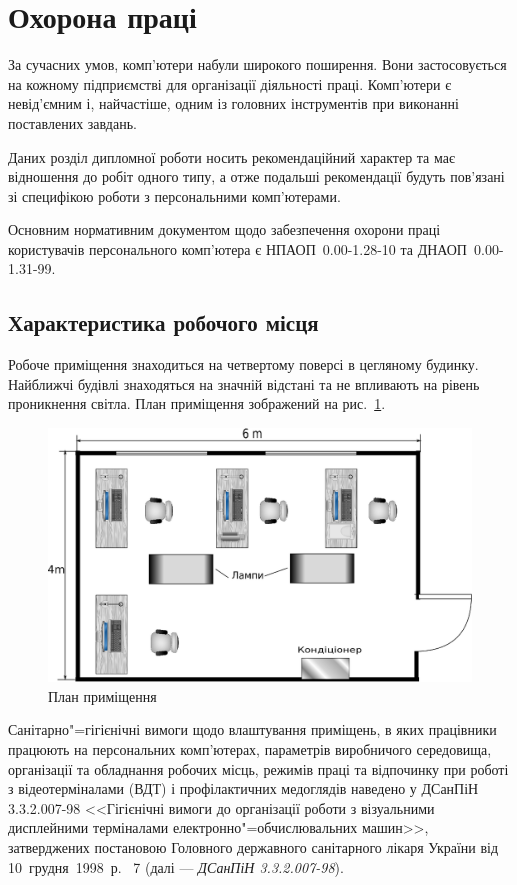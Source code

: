 \documentclass[simple,14pt,utf8,ukrainian]{eskdtext}
\begin{document}
\tableofcontents
\clearpage
\section{Охорона праці}\label{sec:WS}
  За сучасних умов, комп’ютери набули широкого поширення.
  Вони застосовується на кожному підприємстві для організації діяльності
  праці.
  Комп’ютери є невід’ємним і, найчастіше, одним із головних інструментів при
  виконанні поставлених завдань.

  Даних розділ дипломної роботи носить рекомендаційний характер та має
  відношення до робіт одного типу, а отже подальші рекомендації будуть
  пов’язані зі специфікою роботи з персональними комп’ютерами.

  Основним нормативним документом щодо забезпечення охорони праці користувачів
  персонального комп’ютера є НПАОП~0.00-1.28-10 та
  ДНАОП~0.00-1.31-99\cite{about-work-safety}.
  \subsection{Характеристика робочого місця}
    Робоче приміщення знаходиться на четвертому поверсі в цегляному будинку.
    Найближчі будівлі знаходяться на значній відстані та не впливають на
    рівень проникнення світла.
    План приміщення зображений на рис.~\ref{fig:plan}.
    \begin{figure}[ht]
      \centering
      \includegraphics[width=\linewidth]{plan2.eps}
      \caption{План приміщення}
      \label{fig:plan}
    \end{figure}

    Санітарно"=гігієнічні вимоги щодо влаштування приміщень, в яких працівники
    працюють на персональних комп’ютерах, параметрів виробничого середовища,
    організації та обладнання робочих місць, режимів праці та відпочинку при
    роботі з відеотерміналами (ВДТ) і профілактичних медоглядів наведено у
    ДСанПіН 3.3.2.007-98 <<Гігієнічні вимоги до організації роботи з
    візуальними дисплейними терміналами електронно"=обчислювальних машин>>,
    затверджених постановою Головного державного санітарного лікаря України
    від 10~грудня~1998~р. \textnumero~7 (далі --- \emph{ДСанПіН 3.3.2.007-98}).
\end{document}
